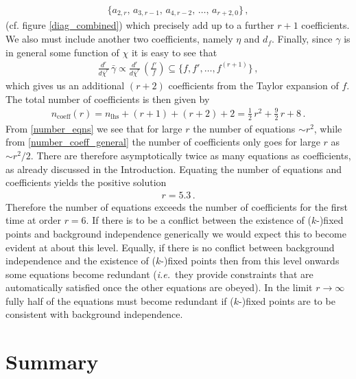 \documentclass[11pt]{book} %
\newcommand\ie{\textit{i.e.}\ }
\numberwithin{equation}{chapter}
\begin{document}
\begin{align}
  \bigg\lbrace
  a_{2,r},\, a_{3,r-1},\, a_{4,r-2},\, \dots,\, a_{r+2,0}
  \bigg\rbrace \,,
\end{align}
(cf. figure \ref{diag_combined}) which precisely add up to a further $r+1$ coefficients.
We also must include another two coefficients, namely $\eta$ and $d_f$.
Finally, since $\gamma$ is in general some function of $\chi$ it is easy to see that
\begin{align}
  \frac{d^r}{d \bar\chi^r} \, \bar{\gamma} \propto \frac{d^r}{d \bar\chi^r} \, \left( \frac{f'}{f}\right) \subseteq
  \bigg\lbrace f, f', \dots, f^{(r+1)}   \bigg\rbrace \,,
\end{align}
which gives us an additional $(r+2)$ coefficients from the Taylor expansion of $f$.
The total number of coefficients is then given by
\begin{align}
  \label{number_coeff_general}
  n_{\text{coeff}}(r) = n_{\text{lhs}} + (r+1) + (r+2) + 2  = \frac{1}{2} \, r^2 + \frac{9}{2} \, r + 8 \,.
\end{align}
From \eqref{number_eqns} we see that for large $r$ the number of equations $\sim r^2$,
while from \eqref{number_coeff_general} the number of coefficients only goes for large $r$ as $\sim r^2/2$.
There are therefore asymptotically twice as many equations as coefficients,
as already discussed in the Introduction.
Equating the number of equations and coefficients yields the positive solution
\begin{align}
  r = 5.3 \,.
\end{align}
Therefore the number of equations exceeds the number of coefficients for the first time at order $r=6$.
If there is to be a conflict between the existence of ($k$-)fixed points and background independence
generically we would expect this to become evident at about this level.
Equally, if there is no conflict between background independence and the existence of ($k$-)fixed points
then from this level onwards some equations become redundant
(\ie they provide constraints that are automatically satisfied once the other equations are obeyed).
In the limit $r\to\infty$ fully half of the equations must become redundant if ($k$-)fixed points are
to be consistent with background independence.


\section{Summary}
\label{sec:conclusions}
\end{document}
